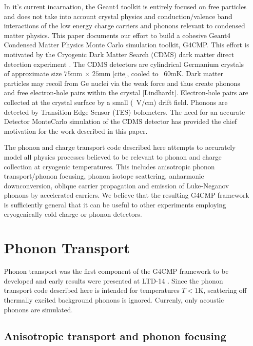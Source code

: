 \documentclass[preprint,12pt]{elsarticle}
\begin{document}
In it's current incarnation, the Geant4 toolkit is entirely focused on free particles and does not take into account crystal physics and conduction/valence band interactions of the low energy charge carriers and phonons relevant to condensed matter physics. This paper documents our effort to build a cohesive Geant4 Condensed Matter Physics Monte Carlo simulation toolkit, G4CMP. This effort is motivated by the Cryogenic Dark Matter Search (CDMS) dark  matter direct detection experiment \cite{CDMS-A}\cite{CDMS-B}\cite{CDMS-C}. The CDMS detectors are cylindrical Germanium crystals of approximate size $75$mm $\times$ $25$mm [cite], cooled to ~$60$mK. Dark matter particles may recoil from Ge nuclei via the weak force and thus create phonons and free electron-hole pairs within the crystal [Lindhardt]. Electron-hole pairs are collected at the crystal surface by a small (~V/cm) drift field. Phonons are detected by Transition Edge Sensor (TES) bolometers. The need for an accurate Detector MonteCarlo simulation of the CDMS detector has provided the chief motivation for the work described in this paper.

The phonon and charge transport code described here attempts to accurately model all physics processes believed to be relevant to phonon and charge collection at cryogenic temperatures. This includes anisotropic phonon transport/phonon focusing, phonon isotope scattering, anharmonic downconversion, oblique carrier propagation and emission of Luke-Neganov phonons by accelerated carriers. We believe that the resulting G4CMP framework is sufficiently general that it can be useful to other experiments employing cryogenically cold charge or phonon detectors. 

\section{Phonon Transport}
\label{sec:PhononTransport}

Phonon transport was the first component of the G4CMP framework to be developed and early results were presented at LTD-14 \cite{Brandt}. Since the phonon transport code described here is intended for temperatures $T<1$K, scattering off thermally excited background phonons is ignored. Currenly, only acoustic phonons are simulated.

\subsection{Anisotropic transport and phonon focusing}
\label{sec:Focusing}
\end{document}
